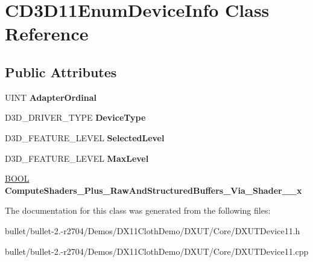 \hypertarget{class_c_d3_d11_enum_device_info}{\section{C\+D3\+D11\+Enum\+Device\+Info Class Reference}
\label{class_c_d3_d11_enum_device_info}
}
\subsection*{Public Attributes}
\begin{DoxyCompactItemize}
\item 
\hypertarget{class_c_d3_d11_enum_device_info_ac719d93a87163eb1ec3dfbff21db304e}{U\+I\+N\+T {\bfseries Adapter\+Ordinal}}\label{class_c_d3_d11_enum_device_info_ac719d93a87163eb1ec3dfbff21db304e}

\item 
\hypertarget{class_c_d3_d11_enum_device_info_a93bddd1faa6665be99823872df7d87f7}{D3\+D\+\_\+\+D\+R\+I\+V\+E\+R\+\_\+\+T\+Y\+P\+E {\bfseries Device\+Type}}\label{class_c_d3_d11_enum_device_info_a93bddd1faa6665be99823872df7d87f7}

\item 
\hypertarget{class_c_d3_d11_enum_device_info_af090bd85a1490e1f62a29fcc7f6d7c70}{D3\+D\+\_\+\+F\+E\+A\+T\+U\+R\+E\+\_\+\+L\+E\+V\+E\+L {\bfseries Selected\+Level}}\label{class_c_d3_d11_enum_device_info_af090bd85a1490e1f62a29fcc7f6d7c70}

\item 
\hypertarget{class_c_d3_d11_enum_device_info_a3c79b43033e0d16f4d60579388775f56}{D3\+D\+\_\+\+F\+E\+A\+T\+U\+R\+E\+\_\+\+L\+E\+V\+E\+L {\bfseries Max\+Level}}\label{class_c_d3_d11_enum_device_info_a3c79b43033e0d16f4d60579388775f56}

\item 
\hypertarget{class_c_d3_d11_enum_device_info_abd3f8edf905e73bb656f3f122b36e4f8}{\hyperlink{_ice_types_8h_a050c65e107f0c828f856a231f4b4e788}{B\+O\+O\+L} {\bfseries Compute\+Shaders\+\_\+\+Plus\+\_\+\+Raw\+And\+Structured\+Buffers\+\_\+\+Via\+\_\+\+Shader\+\_\+\_\+x}}\label{class_c_d3_d11_enum_device_info_abd3f8edf905e73bb656f3f122b36e4f8}

\end{DoxyCompactItemize}


The documentation for this class was generated from the following files\+:\begin{DoxyCompactItemize}
\item 
bullet/bullet-\/2.-\/r2704/\+Demos/\+D\+X11\+Cloth\+Demo/\+D\+X\+U\+T/\+Core/D\+X\+U\+T\+Device11.\+h\item 
bullet/bullet-\/2.-\/r2704/\+Demos/\+D\+X11\+Cloth\+Demo/\+D\+X\+U\+T/\+Core/D\+X\+U\+T\+Device11.\+cpp\end{DoxyCompactItemize}
